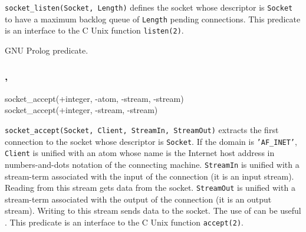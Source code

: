 \Description

\texttt{socket\_listen(Socket, Length)} defines the socket whose descriptor
is \texttt{Socket} to have a maximum backlog queue of \texttt{Length}
pending connections. This predicate is an interface to the C Unix function
\texttt{listen(2)}.

\begin{PlErrors}






\end{PlErrors}

\Portability

GNU Prolog predicate.

\subsubsection{,
               }

\begin{TemplatesOneCol}
socket\_accept(+integer, -atom, -stream, -stream)\\
socket\_accept(+integer, -stream, -stream)

\end{TemplatesOneCol}

\Description

\texttt{socket\_accept(Socket, Client, StreamIn, StreamOut)} extracts the
first connection to the socket whose descriptor is \texttt{Socket}. If the
domain is \texttt{'AF\_INET'}, \texttt{Client} is unified with an atom whose
name is the Internet host address in numbers-and-dots notation of the
connecting machine. \texttt{StreamIn} is unified with a stream-term
associated with the input of the connection (it is an input stream). Reading
from this stream gets data from the socket. \texttt{StreamOut} is unified
with a stream-term associated with the output of the connection (it is an
output stream). Writing to this stream sends data to the socket. The use of
 can be useful . This predicate is an
interface to the C Unix function \texttt{accept(2)}.


